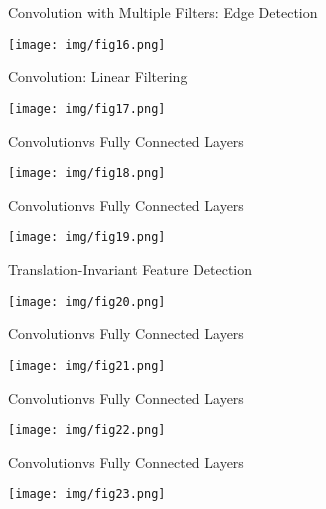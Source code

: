\documentclass[9pt]{beamer}
\begin{document}
\begin{frame}{Convolution with Multiple Filters: Edge Detection}
\begin{center}
	\texttt{[image: img/fig16.png]} 
\end{center}
\end{frame}

\begin{frame}{Convolution: Linear Filtering}
\begin{center}
	\texttt{[image: img/fig17.png]} 
\end{center}
\end{frame}

\begin{frame}{Convolutionvs Fully Connected Layers}
\begin{center}
	\texttt{[image: img/fig18.png]} 
\end{center}
\end{frame}

\begin{frame}{Convolutionvs Fully Connected Layers}
\begin{center}
	\texttt{[image: img/fig19.png]} 
\end{center}
\end{frame}

\begin{frame}{Translation-Invariant Feature Detection}
\begin{center}
	\texttt{[image: img/fig20.png]} 
\end{center}
\end{frame}

\begin{frame}{Convolutionvs Fully Connected Layers}
\begin{center}
	\texttt{[image: img/fig21.png]} 
\end{center}
\end{frame}

\begin{frame}{Convolutionvs Fully Connected Layers}
\begin{center}
	\texttt{[image: img/fig22.png]} 
\end{center}
\end{frame}

\begin{frame}{Convolutionvs Fully Connected Layers}
\begin{center}
	\texttt{[image: img/fig23.png]} 
\end{center}
\end{frame}
\end{document}

